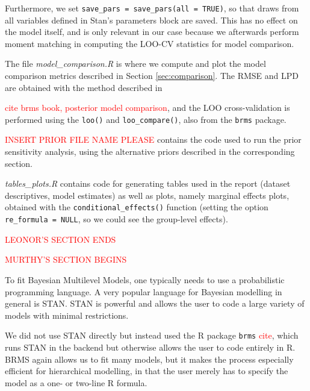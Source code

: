 \documentclass[12pt]{article}
\newcommand{\red}[1]{\textcolor{red}{#1}}
\begin{document}
Furthermore, we set \texttt{save\_pars = save\_pars(all = TRUE)}, so that draws from all variables defined in Stan's parameters block are saved. This has no effect on the model itself, and is only relevant in our case because we afterwards perform moment matching in computing the LOO-CV statistics for model comparison.



The file \textit{model\_comparison.R} is where we compute and plot the model comparison metrics described in Section \ref{sec:comparison}. The RMSE and LPD are obtained with the method described in \cite{brmsbook}

\red{cite brms book, posterior model comparison}, and the LOO cross-validation is performed using the \verb|loo()| and \verb|loo_compare()|, also from the \verb|brms| package.

\red{INSERT PRIOR FILE NAME PLEASE} contains the code used to run the prior sensitivity analysis, using the alternative priors described in the corresponding section.

\textit{tables\_plots.R} contains code for generating tables used in the report (dataset descriptives, model estimates) as well as plots, namely marginal effects plots, obtained with the \verb|conditional_effects()| function (setting the option \texttt{re\_formula = NULL}, so we could see the group-level effects).


\red{LEONOR'S SECTION ENDS}


\red{MURTHY'S SECTION BEGINS}

To fit Bayesian Multilevel Models, one typically needs to use a probabilistic programming language. A very popular language for Bayesian modelling in general is STAN. STAN is powerful and allows the user to code a large variety of models with minimal restrictions.  

We did not use STAN directly but instead used the R package \verb|brms| \red{cite}, which runs STAN in the backend but otherwise allows the user to code entirely in R. BRMS again allows us to fit many models, but it makes the process especially efficient for hierarchical modelling, in that the user merely has to specify the model as a one- or two-line R formula. 
\end{document}
